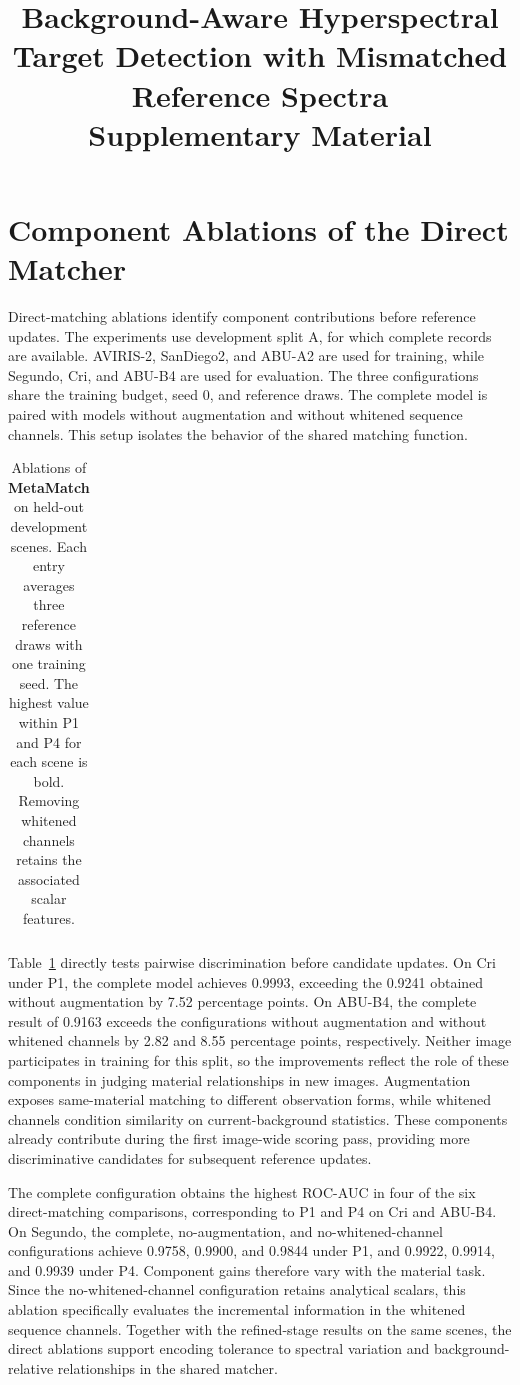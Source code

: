 \documentclass[a4paper,11pt]{article}
\title{\bfseries Background-Aware Hyperspectral Target Detection with Mismatched Reference Spectra\\[0.6em]{\large Supplementary Material}}
\author{}
\date{}
\newcommand{\matcher}{\textbf{MetaMatch}}
\begin{document}
\maketitle
\vspace{-2.5em}
\section{Component Ablations of the Direct Matcher}\label{supp:ablation}
Direct-matching ablations identify component contributions before reference updates. The experiments use development split A, for which complete records are available. AVIRIS-2, SanDiego2, and ABU-A2 are used for training, while Segundo, Cri, and ABU-B4 are used for evaluation. The three configurations share the training budget, seed 0, and reference draws. The complete model is paired with models without augmentation and without whitened sequence channels. This setup isolates the behavior of the shared matching function.

\begin{table}[htbp]\centering\scriptsize\setlength{\tabcolsep}{4pt}
\caption{Ablations of \textbf{\matcher{}} on held-out development scenes. Each entry averages three reference draws with one training seed. The highest value within P1 and P4 for each scene is bold. Removing whitened channels retains the associated scalar features.}\label{tab:ablation}
\begin{tabular}{lrrrrrr}\toprule\end{tabular}
\end{table}

Table~\ref{tab:ablation} directly tests pairwise discrimination before candidate updates. On Cri under P1, the complete model achieves 0.9993, exceeding the 0.9241 obtained without augmentation by 7.52 percentage points. On ABU-B4, the complete result of 0.9163 exceeds the configurations without augmentation and without whitened channels by 2.82 and 8.55 percentage points, respectively. Neither image participates in training for this split, so the improvements reflect the role of these components in judging material relationships in new images. Augmentation exposes same-material matching to different observation forms, while whitened channels condition similarity on current-background statistics. These components already contribute during the first image-wide scoring pass, providing more discriminative candidates for subsequent reference updates.

The complete configuration obtains the highest ROC-AUC in four of the six direct-matching comparisons, corresponding to P1 and P4 on Cri and ABU-B4. On Segundo, the complete, no-augmentation, and no-whitened-channel configurations achieve 0.9758, 0.9900, and 0.9844 under P1, and 0.9922, 0.9914, and 0.9939 under P4. Component gains therefore vary with the material task. Since the no-whitened-channel configuration retains analytical scalars, this ablation specifically evaluates the incremental information in the whitened sequence channels. Together with the refined-stage results on the same scenes, the direct ablations support encoding tolerance to spectral variation and background-relative relationships in the shared matcher.
\end{document}
